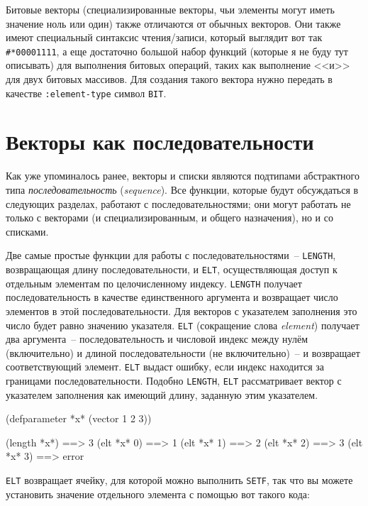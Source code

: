 Битовые векторы (специализированные векторы, чьи элементы могут иметь значение ноль или
один) также отличаются от обычных векторов.  Они также имеют специальный синтаксис
чтения/записи, который выглядит вот так \lstinline!#*00001111!, а еще достаточно большой
набор функций (которые я не буду тут описывать) для выполнения битовых операций, таких как
выполнение <<и>> для двух битовых массивов.  Для создания такого вектора нужно передать
в качестве \lstinline{:element-type} символ \lstinline{BIT}.

\section{Векторы как последовательности}

Как уже упоминалось ранее, векторы и списки являются подтипами абстрактного типа
\textit{последовательность} (\textit{sequence}).  Все функции, которые будут обсуждаться
в следующих разделах, работают с последовательностями; они могут работать не только с векторами
(и специализированным, и общего назначения), но и со списками.

Две самые простые функции для работы с последовательностями~-- \lstinline{LENGTH},
возвращающая длину последовательности, и \lstinline{ELT}, осуществляющая доступ к
отдельным элементам по целочисленному индексу.  \lstinline{LENGTH} получает
последовательность в качестве единственного аргумента и возвращает число элементов в этой
последовательности.  Для векторов с указателем заполнения это число будет равно значению
указателя. \lstinline{ELT} (сокращение слова \textit{element}) получает два аргумента~--
последовательность и числовой индекс между нулём (включительно) и длиной
последовательности (не включительно)~-- и возвращает соответствующий элемент.  \lstinline{ELT} выдаст ошибку,
если индекс находится за границами последовательности.  Подобно \lstinline{LENGTH}, \lstinline{ELT}
рассматривает вектор с указателем заполнения как имеющий длину, заданную этим
указателем.

\begin{myverb}
  (defparameter *x* (vector 1 2 3))
  
  (length *x*) ==> 3
  (elt *x* 0)  ==> 1
  (elt *x* 1)  ==> 2
  (elt *x* 2)  ==> 3
  (elt *x* 3)  ==> error
\end{myverb}

\lstinline{ELT} возвращает ячейку, для которой можно выполнить \lstinline{SETF}, так что вы можете
установить значение отдельного элемента с помощью вот такого кода:

